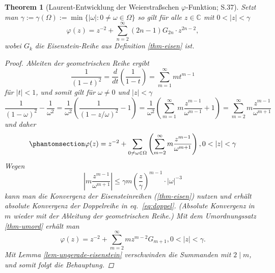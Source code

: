 \documentclass[12pt]{article}
\newtheorem{theorem}{Theorem}[section]
\numberwithin{equation}{section}
\newcommand{\kk}{\cite{kk} }
\begin{document}
\begin{theorem}[Laurent-Entwicklung der Weierstraßschen $\varphi$-Funktion; \kk S.37]

Setzt man
\(\gamma := \gamma (\Omega) := \operatorname{min} \{ |\omega | : 0 \ne \omega \in \Omega \}\)
so gilt für alle \(z \in \mathbb C\) mit \(0 < |z| < \gamma\)
\begin{equation}{
\varphi (z) = z^{-2} + \sum_{n=2}^{\infty} (2n-1) G_{2n} \cdot z^{2n-2},
}\end{equation} wobei \(G_k\) die Eisenstein-Reihe aus Definition
\ref{thm-eisen} ist.

\begin{proof}

Ableiten der geometrischen Reihe ergibt \begin{equation}{
\frac{1}{(1-t)^2} = \frac{d}{dt} \left ( \frac{1}{1-t}  \right ) = \sum_{m=1}^{\infty} m t^{m-1}
}\end{equation} für \(|t|<1\), und somit gilt für \(\omega \ne 0\) und
\(|z|<\gamma\) \begin{equation}{
\frac{1}{(1-\omega)^2} - \frac{1}{\omega^2} =  \frac{1}{\omega^2} \left( \frac{1}{(1-z/\omega)^2} - 1 \right) =  \frac{1}{\omega^2} \left( \sum_{m=1}^{\infty} m \frac{z^{m-1}}{\omega^{m-1}} + 1 \right) = \sum_{m=2}^{\infty} m  \frac{z^{m-1}}{\omega^{m+1}}
}\end{equation} und daher
\begin{equation}\protect\phantomsection\label{eq:doppel}{
\varphi (z) = z^{-2} + \sum_{0 \ne \omega \in \Omega}^{} \left( \sum_{m=2}^{\infty} m  \frac{z^{m-1}}{\omega^{m+1}}   \right) , 0 < |z|<\gamma
}\end{equation} Wegen \begin{equation}{
\left| m  \frac{z^{m-1}}{\omega^{m+1}}  \right| \le \gamma m \left( \frac{z}{\gamma}  \right)^{m-1} \cdot |\omega|^{-3}
}\end{equation} kann man die Konvergenz der Eisensteinreihen
(\ref{thm-eisen}) nutzen und erhält absolute Konvergenz der Doppelreihe
in eq.~\ref{eq:doppel}. (Absolute Konvergenz in \(m\) wieder mit der
Ableitung der geometrischen Reihe.) Mit dem Umordnungssatz
\ref{thm-umord} erhält man \begin{equation}{
\varphi (z) = z^{-2} + \sum_{m=2}^{\infty} m z^{m-2} G_{m+1} , 0 < |z|<\gamma.
}\end{equation} Mit Lemma \ref{lem-ungerade-eisenstein} verschwinden die
Summanden mit \(2 \mid m\), und somit folgt die Behauptung.

\end{proof}

\end{theorem}
\end{document}
